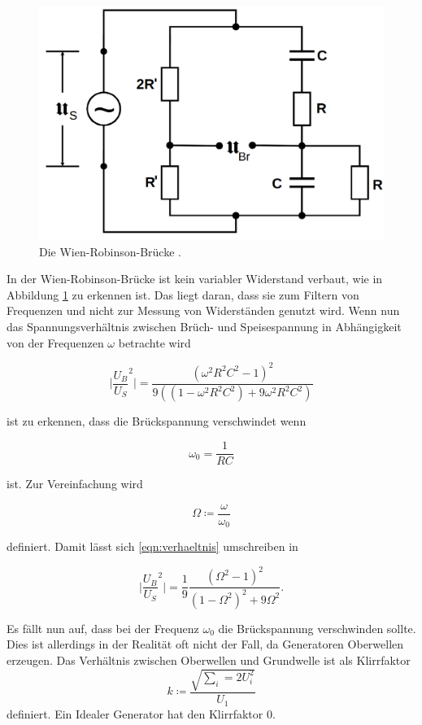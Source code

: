 \begin{figure}
    \centering
    \includegraphics[scale=0.25]{content/Wien-Robinson-Bruecke.png}
    \caption{Die Wien-Robinson-Brücke \cite[S. 223]{anleitung}.}
    \label{fig:wien}
\end{figure}

In der Wien-Robinson-Brücke ist kein variabler Widerstand verbaut, wie in Abbildung \ref{fig:wien}
zu erkennen ist.
Das liegt daran, dass sie zum Filtern von Frequenzen und nicht zur Messung von Widerständen genutzt wird.
Wenn nun das Spannungsverhältnis zwischen Brüch- und Speisespannung in Abhängigkeit von der Frequenzen $\omega$ betrachte wird 

\begin{equation}
\lvert \frac{U_B}{U_S}^2 \rvert = \frac{(\omega^2R^2C^2-1)^2}{9((1-\omega^2R^2C^2) + 9 \omega^2 R^2 C^2)}
\label{eqn:verhaeltnis}
\end{equation}

ist zu erkennen, dass die Brückspannung verschwindet wenn 

\begin{equation}
    \omega_0 = \frac{1}{RC}
\end{equation}

ist. Zur Vereinfachung wird 

\begin{equation*}
    \Omega \coloneq \frac{\omega}{\omega_0}
\end{equation*}

definiert. Damit lässt sich \eqref{eqn:verhaeltnis} umschreiben in

\begin{equation}
\lvert \frac{U_B}{U_S}^2 \rvert = \frac{1}{9} \frac{(\Omega^2 -1)^2}{(1-\Omega^2)^2 + 9\Omega^2}.
\end{equation}

Es fällt nun auf, dass bei der Frequenz $\omega_0$ die Brückspannung verschwinden sollte.
Dies ist allerdings in der Realität oft nicht der Fall, da Generatoren Oberwellen erzeugen.
Das Verhältnis zwischen Oberwellen und Grundwelle ist als Klirrfaktor
\begin{equation*}
    k \coloneq \frac{\sqrt{\sum_i=2 U_i^2}}{U_1}
\end{equation*}
definiert. Ein Idealer Generator hat den Klirrfaktor 0.